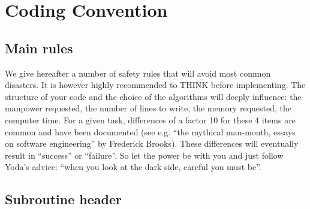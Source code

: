 \chapter{\telemacsystem Coding Convention}
\label{codingconv}

\section{Main rules}

We give hereafter a number of safety rules that will avoid most common
disasters. It is however highly recommended to THINK before implementing. The
structure of your code and the choice of the algorithms will deeply influence:
the manpower requested, the number of lines to write, the memory requested, the
computer time. For a given task, differences of a factor 10 for these 4 items
are common and have been documented (see e.g. “the mythical man-month, essays
on software engineering” by Frederick Brooks). These differences will
eventually result in “success” or “failure”. So let the power be with you and
just follow Yoda’s advice: “when you look at the dark side, careful you must
be”.

\section{Subroutine header}

